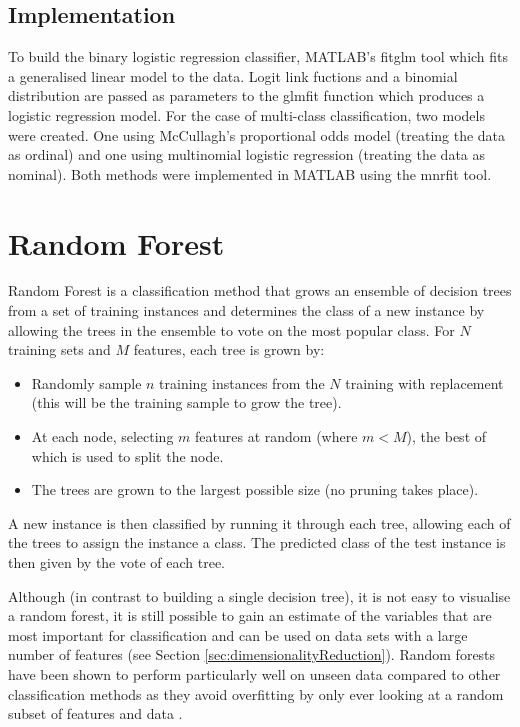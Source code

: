 \orderedLogit
\subsection{Implementation}

To build the binary logistic regression classifier, MATLAB's fitglm tool which fits a generalised linear model to the data. Logit link fuctions and a binomial distribution are passed as parameters to the glmfit function which produces a logistic regression model. For the case of multi-class classification, two models were created. One using McCullagh's proportional odds model (treating the data as ordinal) and one using multinomial logistic regression (treating the data as nominal). Both methods were implemented in MATLAB using the mnrfit tool.

\section{Random Forest}

Random Forest is a classification method that grows an ensemble of decision trees from a set of training instances and determines the class of a new instance by allowing the trees in the ensemble to vote on the most popular class. For $N$ training sets and $M$ features, each tree is grown by:

\begin{itemize}
\item Randomly sample $n$ training instances from the $N$ training with replacement (this will be the training sample to grow the tree).
\item At each node, selecting $m$ features at random (where $m < M$), the best of which is used to split the node.
\item The trees are grown to the largest possible size (no pruning takes place).
\end{itemize}

A new instance is then classified by running it through each tree, allowing each of the trees to assign the instance a class. The predicted class of the test instance is then given by the vote of each tree.

Although (in contrast to building a single decision tree), it is not easy to visualise a random forest, it is still possible to gain an estimate of the variables that are most important for classification and can be used on data sets with a large number of features (see Section \ref{sec:dimensionalityReduction}). Random forests have been shown to perform particularly well on unseen data compared to other classification methods as they avoid overfitting by only ever looking at a random subset of features and data \cite{Breiman}. 

